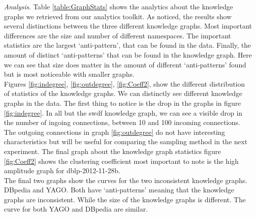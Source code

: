 \documentclass[11pt,letterpaper ,oneside ]{book}
\begin{document}
	\textit{Analysis}. Table \ref{table:GraphStats} shows the analytics about the knowledge graphs we retrieved from our analytics toolkit. As noticed, the results show several distinctions between the three different knowledge graphs. Most important differences are the size and number of different namespaces. The important statistics are the largest `anti-pattern', that can be found in the data. Finally, the amount of distinct `anti-patterns' that can be found in the knowledge graph. Here we can see that size does matter in the amount of different `anti-patterns' found but is most noticeable with smaller graphs. \\
	Figures \ref{fig:indegree},  \ref{fig:outdegree},  \ref{fig:Coeff2}, show the different distribution of statistics of the knowledge graphs. We can distinctly see different knowledge graphs in the data. The first thing to notice is the drop in the graphs in figure \ref{fig:indegree}. In all but the swdf knowledge graph, we can see a visible drop in the number of ingoing connections, between 10 and 100 incoming connections. \\
	The outgoing connections in graph \ref{fig:outdegree} do not have interesting characteristics but will be useful for comparing the sampling method in the next experiment. 
	The final graph about the knowledge graph statistics figure \ref{fig:Coeff2} shows the clustering coefficient most important to note is the high amplitude graph for dblp-2012-11-28b. \\
	The final two graphs show the curves for the two inconsistent knowledge graphs. DBpedia and YAGO. Both have `anti-patterns' meaning that the knowledge graphs are inconsistent. While the size of the knowledge graphs is different. The curve for both YAGO and DBpedia are similar. 
	
\end{document}
